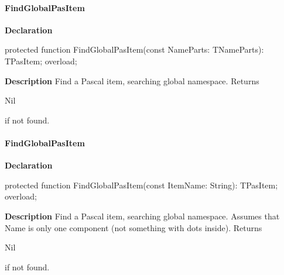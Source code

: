 \documentclass{report}
\newif\ifpdf
\begin{document}
\paragraph*{FindGlobalPasItem}\hspace*{\fill}

\label{PasDoc_Gen.TDocGenerator-FindGlobalPasItem}
\begin{list}{}{
\setlength{\itemindent}{0cm}
\setlength{\listparindent}{0cm}
\setlength{\leftmargin}{\evensidemargin}
\addtolength{\leftmargin}{\tmplength}
\settowidth{\labelsep}{X}
\addtolength{\leftmargin}{\labelsep}
\setlength{\labelwidth}{\tmplength}
}
\item[\textbf{Declaration}\hfill]
\ifpdf
\begin{flushleft}
\fi
\begin{ttfamily}
protected function FindGlobalPasItem(const NameParts: TNameParts): TPasItem; overload;\end{ttfamily}

\ifpdf
\end{flushleft}
\fi

\par
\item[\textbf{Description}]
Find a Pascal item, searching global namespace. Returns \begin{ttfamily}Nil\end{ttfamily} if not found.

\end{list}
\paragraph*{FindGlobalPasItem}\hspace*{\fill}

\label{PasDoc_Gen.TDocGenerator-FindGlobalPasItem}
\begin{list}{}{
\setlength{\itemindent}{0cm}
\setlength{\listparindent}{0cm}
\setlength{\leftmargin}{\evensidemargin}
\addtolength{\leftmargin}{\tmplength}
\settowidth{\labelsep}{X}
\addtolength{\leftmargin}{\labelsep}
\setlength{\labelwidth}{\tmplength}
}
\item[\textbf{Declaration}\hfill]
\ifpdf
\begin{flushleft}
\fi
\begin{ttfamily}
protected function FindGlobalPasItem(const ItemName: String): TPasItem; overload;\end{ttfamily}

\ifpdf
\end{flushleft}
\fi

\par
\item[\textbf{Description}]
Find a Pascal item, searching global namespace. Assumes that Name is only one component (not something with dots inside). Returns \begin{ttfamily}Nil\end{ttfamily} if not found.

\end{list}
\end{document}
